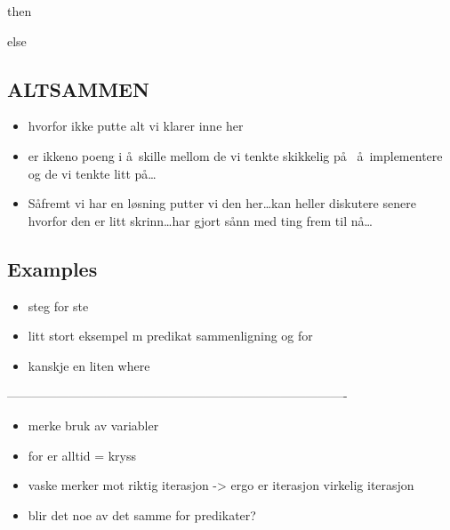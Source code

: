 then

else

\subsection{ALTSAMMEN}
\begin{itemize}
  \item hvorfor ikke putte alt vi klarer inne her
  \item er ikkeno poeng i \aa~skille mellom de vi tenkte skikkelig p\aa~ \aa~implementere og de vi tenkte litt
  p\aa\ldots
  \item S\aa fremt vi har en l\o sning putter vi den her\ldots kan heller diskutere senere hvorfor den er litt
  skrinn\ldots har gjort s\aa nn med ting frem til n\aa\ldots
\end{itemize}

\subsection{Examples}
\label{sect:translation:markxremoveExamples}
\begin{itemize}
\item steg for ste
\item litt stort eksempel m predikat sammenligning og for
\item kanskje en liten where
\end{itemize}
----------------------------------------------------------------------------------

\begin{itemize}
\item merke bruk av variabler
\item for er alltid = kryss
\item vaske merker mot riktig iterasjon -> ergo er iterasjon virkelig iterasjon
\item blir det noe av det samme for predikater?
\end{itemize}